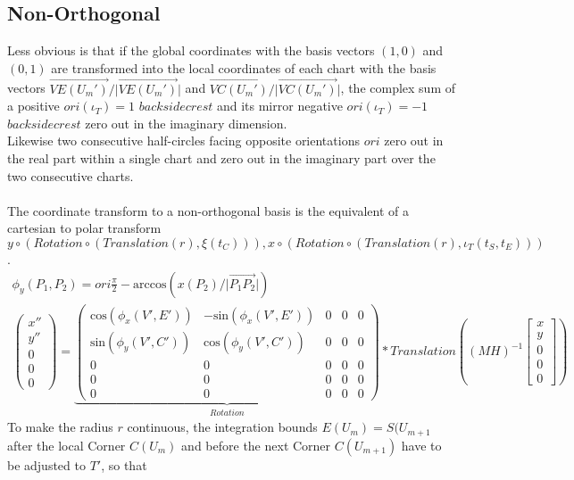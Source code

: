 \documentclass{report}
\begin{document}
\subsection{Non-Orthogonal}
Less obvious is that if the global coordinates with the basis vectors $(1,0)$ and $(0,1)$ are transformed into the local coordinates of each chart with the basis vectors $\overrightarrow{VE(U_{m}')}/\lvert \overrightarrow{VE(U_{m}')}\rvert$ and $\overrightarrow{VC(U_{m}')}/\lvert \overrightarrow{VC(U_{m}')}\rvert$, the complex sum of a positive $ori(\iota_{T})=1$ $backsidecrest$ and its mirror negative $ori(\iota_{T})=-1$ $backsidecrest$ zero out in the imaginary dimension.\\
Likewise two consecutive half-circles facing opposite orientations $ori$ zero out in the real part within a single chart and zero out in the imaginary part over the two consecutive charts.\\\\
The coordinate transform to a non-orthogonal basis is the equivalent of a cartesian to polar transform $y\circ (Rotation\circ (Translation(r),\xi(t_{C}))),x\circ (Rotation\circ (Translation(r),\iota_{T}(t_{S},t_{E})))$.
\begin{align}
\phi_{y}(P_{1},P_{2}) = ori\frac{\pi}{2}-\mathrm{arccos}(x(P_{2})/\lvert \overrightarrow{P_{1}P_{2}}\rvert)\\
\begin{pmatrix}x'' \\ y'' \\ 0 \\ 0 \\ 0\end{pmatrix}=
\underbrace{
\begin{pmatrix}
\mathrm{cos}(\phi_{x}(V',E')) & -\mathrm{sin}(\phi_{x}(V',E')) & 0 & 0 & 0 \\
\mathrm{sin}(\phi_{y}(V',C')) & \mathrm{cos}(\phi_{y}(V',C')) & 0 & 0 & 0 \\
0 & 0 & 0 & 0 & 0 \\
0 & 0 & 0 & 0 & 0 \\
0 & 0 & 0 & 0 & 0
\end{pmatrix}
}_{Rotation}*
Translation((MH)^{-1}\begin{bmatrix} x \\ y \\ 0 \\ 0 \\ 0 \end{bmatrix})
\end{align}
To make the radius $r$ continuous, the integration bounds $E(U_{m})=S(U_{m+1}$ after the local Corner $C(U_{m})$ and before the next Corner $C(U_{m+1})$ have to be adjusted to $T'$, so that
\end{document}
